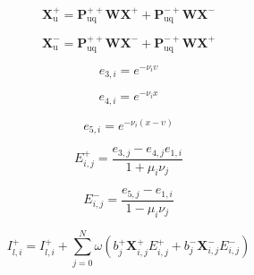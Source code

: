 \begin{equation}
\mathbf{X}^{+}_{\mathrm{u}} = \mathbf{P}^{++}_{\mathrm{uq}}\mathbf{W}\mathbf{X}^{+} + \mathbf{P}^{-+}_{\mathrm{uq}}\mathbf{W}\mathbf{X}^{-}
\label{eq:source_function_integration-local_source_classical-upward-forward-solar_source-X_p_u}
\end{equation}

\begin{equation}
\mathbf{X}^{-}_{\mathrm{u}} = \mathbf{P}^{++}_{\mathrm{uq}}\mathbf{W}\mathbf{X}^{-} + \mathbf{P}^{-+}_{\mathrm{uq}}\mathbf{W}\mathbf{X}^{+}
\label{eq:source_function_integration-local_source_classical-upward-forward-homogeneous_solution-X_m_u}
\end{equation}

\begin{equation}
e_{3,i} = e^{-\nu_{i}\upsilon}
\label{eq:source_function_integration-local_source_classical-upward-forward-homogeneous_solution-e_3_i}
\end{equation}

\begin{equation}
e_{4,i} = e^{-\nu_{i}x}
\label{eq:source_function_integration-local_source_classical-upward-forward-homogeneous_solution-e_4_i}
\end{equation}

\begin{equation}
e_{5,i} = e^{-\nu_{i}(x - \upsilon)}
\label{eq:source_function_integration-local_source_classical-upward-forward-homogeneous_solution-e_5_i}
\end{equation}

\begin{equation}
E^{+}_{i,j} = \frac{e_{3,j} - e_{4,j}e_{1,i}}{1 + \mu_{i}\nu_{j}}
\label{eq:source_function_integration-local_source_classical-upward-forward-homogeneous_solution-E_p}
\end{equation}

\begin{equation}
E^{-}_{i,j} = \frac{e_{5,j} -        e_{1,i}}{1 - \mu_{i}\nu_{j}}
\label{eq:source_function_integration-local_source_classical-upward-forward-homogeneous_solution-E_m}
\end{equation}

\begin{equation}
I^{+}_{l,i} = I^{+}_{l,i} + \sum^{N}_{j = 0} \omega (b^{+}_{j}\mathbf{X}^{+}_{i,j}E^{+}_{i,j} + b^{-}_{j}\mathbf{X}^{-}_{i,j}E^{-}_{i,j})
\label{eq:source_function_integration-local_source_classical-upward-forward-homogeneous_solution-I_p_l_i_2}
\end{equation}


